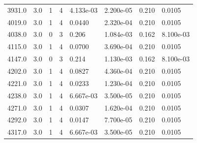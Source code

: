\documentclass[preview]{standalone}
\begin{document}
{{{\begin{tabular}{L{1.2cm}C{1.2cm} C{0.3cm}C{0.5cm} C{1.4cm}C{1.4cm} C{1.4cm}C{1.4cm}}
  3931.0  &   3.0  & 1     &  4 &  4.133e-03  & 2.200e-05  & 0.210 &  0.0105   \\ 
  4019.0  &   3.0  & 1     &  4 &  0.0440  & 2.320e-04  & 0.210 &  0.0105   \\ 
  4038.0  &   3.0  & 0     &  3 &  0.206  & 1.084e-03  & 0.162 &  8.100e-03   \\ 
  4115.0  &   3.0  & 1     &  4 &  0.0700  & 3.690e-04  & 0.210 &  0.0105   \\ 
  4147.0  &   3.0  & 0     &  3 &  0.214  & 1.130e-03  & 0.162 &  8.100e-03   \\ 
  4202.0  &   3.0  & 1     &  4 &  0.0827  & 4.360e-04  & 0.210 &  0.0105   \\ 
  4221.0  &   3.0  & 1     &  4 &  0.0233  & 1.230e-04  & 0.210 &  0.0105   \\ 
  4238.0  &   3.0  & 1     &  4 &  6.667e-03  & 3.500e-05  & 0.210 &  0.0105   \\ 
  4271.0  &   3.0  & 1     &  4 &  0.0307  & 1.620e-04  & 0.210 &  0.0105   \\ 
  4292.0  &   3.0  & 1     &  4 &  0.0147  & 7.700e-05  & 0.210 &  0.0105   \\ 
  4317.0  &   3.0  & 1     &  4 &  6.667e-03  & 3.500e-05  & 0.210 &  0.0105   \\ 
\hline 
\end{tabular} 

}}}
\end{document}
